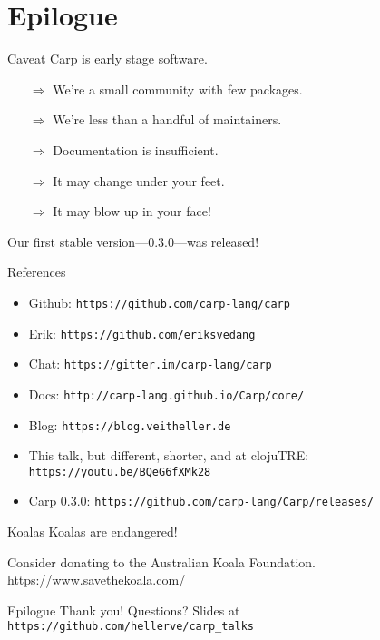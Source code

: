 \documentclass[14pt,aspectratio=169]{beamer}
\begin{document}
  \section{Epilogue}
  \begin{frame}{Caveat}
    Carp is early stage software.
    \begin{itemize}
      \item[$\Rightarrow$] We’re a small community with few packages.
      \item[$\Rightarrow$] We’re less than a handful of maintainers.
      \item[$\Rightarrow$] Documentation is insufficient.
      \item[$\Rightarrow$] It may change under your feet.
      \item[$\Rightarrow$] It may blow up in your face!
    \end{itemize}
    Our first stable version—0.3.0—was released!
  \end{frame}
  \begin{frame}{References}
    \begin{itemize}
      \item Github: \texttt{https://github.com/carp-lang/carp}
      \item Erik: \texttt{https://github.com/eriksvedang}
      \item Chat: \texttt{https://gitter.im/carp-lang/carp}
      \item Docs: \texttt{http://carp-lang.github.io/Carp/core/}
      \item Blog: \texttt{https://blog.veitheller.de}
      \item This talk, but different, shorter, and at clojuTRE: \texttt{https://youtu.be/BQeG6fXMk28}
      \item Carp 0.3.0: \texttt{https://github.com/carp-lang/Carp/releases/}
    \end{itemize}
  \end{frame}
  \begin{frame}{Koalas}
    Koalas are endangered!
    \linebreak

    Consider donating to the Australian Koala Foundation.
    https://www.savethekoala.com/
  \end{frame}
  \begin{frame}{Epilogue}
    \Huge Thank you!
    \linebreak
    \linebreak
    \linebreak
    \small Questions?
    \linebreak
    \linebreak
    \tiny Slides at \texttt{https://github.com/hellerve/carp\_talks}
  \end{frame}
\end{document}
